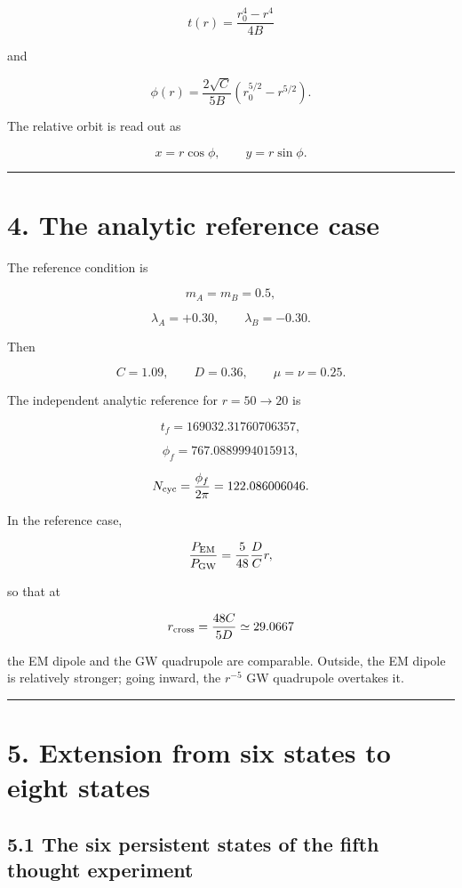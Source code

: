 \documentclass[
  a4paper,
]{article}
\begin{document}
\[
\boxed{
t(r)=\frac{r_0^4-r^4}{4B}}
\]

and

\[
\boxed{
\phi(r)=\frac{2\sqrt C}{5B}
\left(r_0^{5/2}-r^{5/2}\right)
}.
\]

The relative orbit is read out as

\[
\boxed{
x=r\cos\phi,
\qquad
y=r\sin\phi}.
\]

\begin{center}\rule{0.5\linewidth}{0.5pt}\end{center}

\section{4. The analytic reference
case}\label{the-analytic-reference-case}

The reference condition is

\[
m_A=m_B=0.5,
\]

\[
\lambda_A=+0.30,
\qquad
\lambda_B=-0.30.
\]

Then

\[
C=1.09,
\qquad
D=0.36,
\qquad
\mu=\nu=0.25.
\]

The independent analytic reference for \(r=50\rightarrow20\) is

\[
t_f=169032.31760706357,
\]

\[
\phi_f=767.0889994015913,
\]

\[
N_{\rm cyc}=\frac{\phi_f}{2\pi}
=122.086006046.
\]

In the reference case,

\[
\frac{P_{\rm EM}}{P_{\rm GW}}
=
\frac{5}{48}\frac{D}{C}r,
\]

so that at

\[
r_{\rm cross}
=
\frac{48C}{5D}
\simeq29.0667
\]

the EM dipole and the GW quadrupole are comparable. Outside, the EM
dipole is relatively stronger; going inward, the \(r^{-5}\) GW
quadrupole overtakes it.

\begin{center}\rule{0.5\linewidth}{0.5pt}\end{center}

\section{5. Extension from six states to eight
states}\label{extension-from-six-states-to-eight-states}

\subsection{5.1 The six persistent states of the fifth thought
experiment}\label{the-six-persistent-states-of-the-fifth-thought-experiment}
\end{document}
